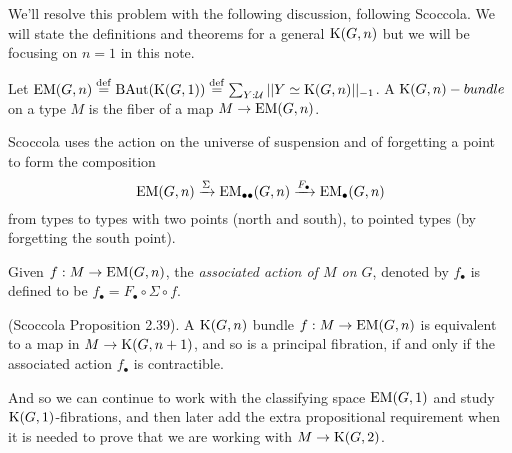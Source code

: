 We'll resolve this problem with the following discussion, following Scoccola\cite{sco}. We will state the definitions and theorems for a general \( \mathrm{K}(G,n) \) but we will be focusing on \( n=1 \) in this note.

\begin{mydef}
Let \( \mathrm{EM}(G,n)\stackrel{\mathrm{def}}{=} \mathrm{BAut}(\mathrm{K}(G,1))\stackrel{\mathrm{def}}{=} \sum_{Y:\mathcal{U}}||Y\simeq \mathrm{K}(G,n)||_{-1}\). A \( \mathrm{K}(G,n)-bundle \) on a type \( M \) is the fiber of a map \( M\to\mathrm{EM}(G,n) \).
\end{mydef}

Scoccola uses the action on the universe of suspension and of forgetting a point to form the composition 
\[ 
\mathrm{EM}(G,n)\xrightarrow[]{\Sigma} \mathrm{EM}_{\bullet\bullet}(G,n)\xrightarrow[]{F_\bullet}\mathrm{EM_{\bullet}}(G,n)
\]
from types to types with two points (north and south), to pointed types (by forgetting the south point).

\begin{mydef}
Given \( f:M\to\mathrm{EM}(G,n) \), the \emph{associated action of \( M \) on \( G \)}, denoted by \( f_\bullet \) is defined to be \( f_\bullet=F_\bullet\circ\Sigma\circ f \).
\end{mydef}

\begin{mythm}
(Scoccola\cite{sco} Proposition 2.39). A \( \mathrm{K}(G,n) \) bundle \( f:M\to\mathrm{EM}(G,n) \) is equivalent to a map in \( M\to\mathrm{K}(G,n+1) \), and so is a principal fibration, if and only if the associated action \( f_\bullet \) is contractible.
\end{mythm}

And so we can continue to work with the classifying space \( \mathrm{EM}(G,1) \) and study \( \mathrm{K}(G,1) \)-fibrations, and then later add the extra propositional requirement when it is needed to prove that we are working with \( M\to\mathrm{K}(G,2) \).


